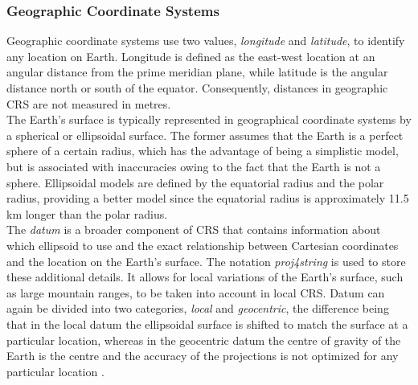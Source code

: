 \subsubsection*{Geographic Coordinate Systems}
Geographic coordinate systems use two values, \textit{longitude} and \textit{latitude}, to identify any location on Earth. Longitude is defined as the east-west location at an angular distance from the prime meridian plane, while latitude is the angular distance north or south of the equator. Consequently, distances in geographic CRS are not measured in metres. \\
The Earth's surface is typically represented in geographical coordinate systems by a spherical or ellipsoidal surface. The former assumes that the Earth is a perfect sphere of a certain radius, which has the advantage of being a simplistic model, but is associated with inaccuracies owing to the fact that the Earth is not a sphere. Ellipsoidal models are defined by the equatorial radius and the polar radius, providing a better model since the equatorial radius is approximately 11.5 km longer than the polar radius.\\
The \textit{datum} is a broader component of CRS that contains information about which ellipsoid to use and the exact relationship between Cartesian coordinates and the location on the Earth's surface. The notation \textit{proj4string} is used to store these additional details. It allows for local variations of the Earth's surface, such as large mountain ranges, to be taken into account in local CRS. Datum can again be divided into two categories, \textit{local} and \textit{geocentric}, the difference being that in the local datum the ellipsoidal surface is shifted to match the surface at a particular location, whereas in the geocentric datum the centre of gravity of the Earth is the centre and the accuracy of the projections is not optimized for any particular location \autocite[][]{lovelace2019geocomputation}.
